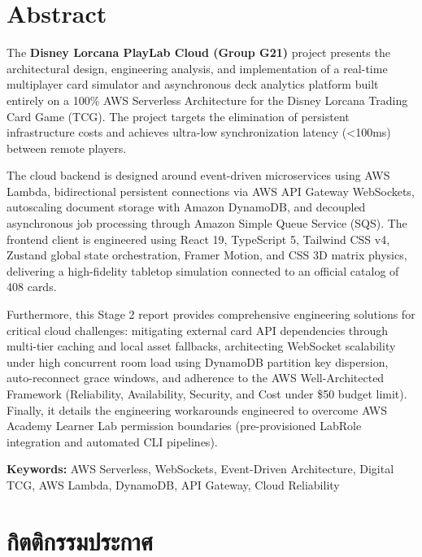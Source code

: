 \documentclass[12pt,a4paper]{report}
\begin{document}
\newpage

\chapter*{Abstract}

The \textbf{Disney Lorcana PlayLab Cloud (Group G21)} project presents the architectural design, engineering analysis, and implementation of a real-time multiplayer card simulator and asynchronous deck analytics platform built entirely on a 100\% AWS Serverless Architecture for the Disney Lorcana Trading Card Game (TCG). The project targets the elimination of persistent infrastructure costs and achieves ultra-low synchronization latency (<100ms) between remote players.

The cloud backend is designed around event-driven microservices using AWS Lambda, bidirectional persistent connections via AWS API Gateway WebSockets, autoscaling document storage with Amazon DynamoDB, and decoupled asynchronous job processing through Amazon Simple Queue Service (SQS). The frontend client is engineered using React 19, TypeScript 5, Tailwind CSS v4, Zustand global state orchestration, Framer Motion, and CSS 3D matrix physics, delivering a high-fidelity tabletop simulation connected to an official catalog of 408 cards.

Furthermore, this Stage 2 report provides comprehensive engineering solutions for critical cloud challenges: mitigating external card API dependencies through multi-tier caching and local asset fallbacks, architecting WebSocket scalability under high concurrent room load using DynamoDB partition key dispersion, auto-reconnect grace windows, and adherence to the AWS Well-Architected Framework (Reliability, Availability, Security, and Cost under \$50 budget limit). Finally, it details the engineering workarounds engineered to overcome AWS Academy Learner Lab permission boundaries (pre-provisioned LabRole integration and automated CLI pipelines).

\vspace{0.8cm}
\noindent \textbf{Keywords:} AWS Serverless, WebSockets, Event-Driven Architecture, Digital TCG, AWS Lambda, DynamoDB, API Gateway, Cloud Reliability

\newpage

\chapter*{กิตติกรรมประกาศ}
\end{document}
